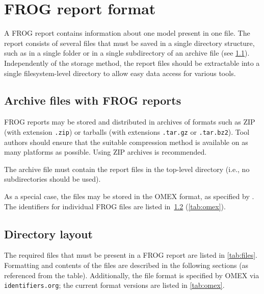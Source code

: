 \chapter{FROG report format}
\label{chap:spec}

A FROG report contains information about one model present in one file.
The report consists of several files that must be saved in a single directory structure, such as in a single folder or in a single subdirectory of an archive file (see \cref{sec:archives}).
Independently of the storage method, the report files should be extractable into a single filesystem-level directory to allow easy data access for various tools.

\section{Archive files with FROG reports}
\label{sec:archives}

FROG reports may be stored and distributed in archives of formats such as ZIP (with extension \texttt{.zip}) or tarballs (with extensions \texttt{.tar.gz} or \texttt{.tar.bz2}).
Tool authors should ensure that the suitable compression method is available on as many platforms as possible. Using ZIP archives is recommended.

The archive file must contain the report files in the top-level directory (i.e., no subdirectories should be used).

As a special case, the files may be stored in the OMEX format, as specified by \citeauthor{bergmann2014omex}. The identifiers for individual FROG files are listed in~\cref{sec:files} (\cref{tab:omex}).

\section{Directory layout}
\label{sec:files}

The required files that must be present in a FROG report are listed in \cref{tab:files}. Formatting and contents of the files are described in the following sections (as referenced from the table). Additionally, the file format is specified by OMEX via \texttt{identifiers.org}; the current format versions are listed in \cref{tab:omex}.

